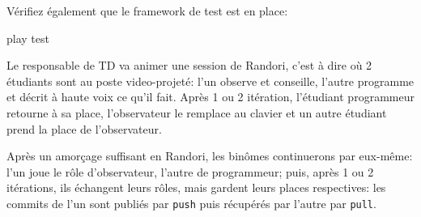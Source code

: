 \documentclass{TD}
\begin{document}
Vérifiez également que le framework de test est en place:
\begin{bash}
play test
\end{bash}


Le responsable de TD va animer une session de Randori, c'est à dire où 2
étudiants sont au poste video-projeté: l'un observe et conseille, l'autre
programme et décrit à haute voix ce qu'il fait. Après 1 ou 2 itération,
l'étudiant programmeur retourne à sa place, l'observateur le remplace au
clavier et un autre étudiant prend la place de l'observateur.


Après un amorçage suffisant en Randori, les binômes continuerons par eux-même:
l'un joue le rôle d'observateur, l'autre de programmeur; puis, après 1 ou 2
itérations, ils échangent leurs rôles, mais gardent leurs places respectives:
les commits de l'un sont publiés par \texttt{push} puis récupérés par l'autre
par \texttt{pull}.
\end{document}

